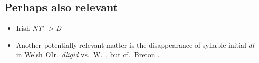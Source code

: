 \subsection{Perhaps also relevant}
\begin{itemize}
    \item Irish \textit{NT -> D}
    \item Another potentially relevant matter is the disappearance of syllable-initial \textit{dl} in Welsh OIr.\ \textit{dligid} vs.\ W.\ , but cf.\ Breton .
\end{itemize}

